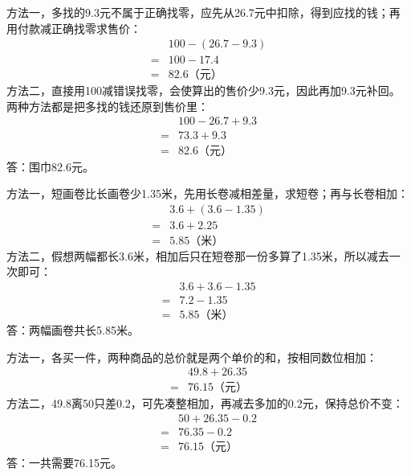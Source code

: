 \documentclass[multi=snippet,border=0pt]{standalone}
\newenvironment{snippet}[3]{\begin{minipage}{#1bp}\color{answerred}\fontsize{#2}{#3}\selectfont\raggedright}{\end{minipage}}
\begin{document}
\begin{snippet}{505}{11.5}{14}方法一，多找的9.3元不属于正确找零，应先从26.7元中扣除，得到应找的钱；再用付款减正确找零求售价：\[\begin{aligned}&100-(26.7-9.3)\\={}&100-17.4\\={}&82.6\text{（元）}\end{aligned}\]方法二，直接用100减错误找零，会使算出的售价少9.3元，因此再加9.3元补回。两种方法都是把多找的钱还原到售价里：\[\begin{aligned}&100-26.7+9.3\\={}&73.3+9.3\\={}&82.6\text{（元）}\end{aligned}\]答：围巾82.6元。\end{snippet}
\begin{snippet}{505}{11.5}{14}方法一，短画卷比长画卷少1.35米，先用长卷减相差量，求短卷；再与长卷相加：\[\begin{aligned}&3.6+(3.6-1.35)\\={}&3.6+2.25\\={}&5.85\text{（米）}\end{aligned}\]方法二，假想两幅都长3.6米，相加后只在短卷那一份多算了1.35米，所以减去一次即可：\[\begin{aligned}&3.6+3.6-1.35\\={}&7.2-1.35\\={}&5.85\text{（米）}\end{aligned}\]答：两幅画卷共长5.85米。\end{snippet}
\begin{snippet}{505}{11.5}{14}方法一，各买一件，两种商品的总价就是两个单价的和，按相同数位相加：\[\begin{aligned}&49.8+26.35\\={}&76.15\text{（元）}\end{aligned}\]方法二，49.8离50只差0.2，可先凑整相加，再减去多加的0.2元，保持总价不变：\[\begin{aligned}&50+26.35-0.2\\={}&76.35-0.2\\={}&76.15\text{（元）}\end{aligned}\]答：一共需要76.15元。\end{snippet}
\end{document}

